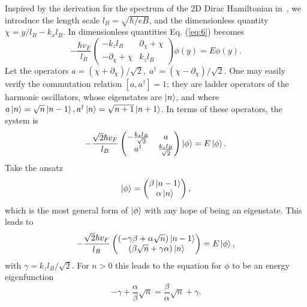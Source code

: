 Inspired by the derivation for the spectrum of the 2D Dirac Hamiltonian in~\cite{wehlingDiracMaterials2014}, we introduce the length scale $l_B = \sqrt{\hbar / eB}$, and the dimensionless quantity $\chi = y /l_{B} - k_x l_{B}$.
In dimensionless quantities Eq. (\ref{eq:6}) becomes
\begin{equation}
  -\frac{{\hbar v_F}}{l_{B}}
  \begin{pmatrix}
    -k_z l_B & \partial _{\chi } + \chi \\
    -\partial _{\chi } + \chi & k_z l_B
  \end{pmatrix}
  \phi(y)  =  E \phi(y).
\end{equation}
Let the operators \(a = \left( \chi + \partial _{\chi } \right) / \sqrt{2},\; a^{\dagger} = \left( \chi - \partial _{\chi } \right) /\sqrt{2}\).
One may easily verify the commutation relation $[a, a^{\dagger}] = 1$;
they are ladder operators of the harmonic oscillators, whose eigenstates are $\ket{n}$, and where $a\ket{n} = \sqrt{n}\ket{n-1}, a^{\dagger} \ket{n} = \sqrt{n+1} \ket{n+1}$.
In terms of these operators, the system is
\begin{equation}
  -\frac{\sqrt{2} \hbar v_F}{l_B}
  \begin{pmatrix}
    -\frac{k_zl_B}{\sqrt{2}} & a\\
    a^{\dagger} & \frac{k_zl_B}{\sqrt{2}}
  \end{pmatrix}
  \ket{\phi } = E \ket{\phi }.
\end{equation}
Take the ansatz
\begin{equation}
  \ket{\phi } =
  \begin{pmatrix}
    \beta \ket{n-1}\\
    \alpha  \ket{n}
  \end{pmatrix},
\end{equation}
which is the most general form of $\ket{\phi }$ with any hope of being an eigenstate.
This leads to
\begin{equation}
  -\frac{\sqrt{2} \hbar v_F}{l_B}
  \begin{pmatrix}
    \left( -\gamma \beta + \alpha \sqrt{n} \right) \ket{n-1}\\
    \left( \beta \sqrt{n} + \gamma \alpha \right) \ket{n}
  \end{pmatrix}
  = E \ket{\phi },
\end{equation}
with $\gamma  = k_zl_B / \sqrt{2}$.
For $n > 0$ this leads to the equation for $\phi $ to be an energy eigenfunction
\begin{equation}
  -\gamma + \frac{\alpha}{\beta } \sqrt{n} = \frac{\beta }{\alpha } \sqrt{n} + \gamma.
\end{equation}
